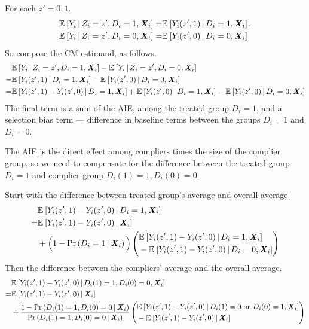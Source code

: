 For each $z' =0, 1$.
\begin{align*}
    \Egiven{Y_i}{Z_i = z', D_i = 1, \vec X_i}
    =& \Egiven{Y_i(z', 1)}{D_i = 1, \vec X_i}, \\
    \Egiven{Y_i}{Z_i = z', D_i = 0, \vec X_i}
    =& \Egiven{Y_i(z', 0)}{D_i = 0, \vec X_i}
\end{align*}
So compose the CM estimand, as follows.
\begin{align*}
    & \Egiven{Y_i}{Z_i = z', D_i = 1, \vec X_i}
    - \Egiven{Y_i}{Z_i = z', D_i = 0, \vec X_i} \\
    =& \Egiven{Y_i(z', 1)}{D_i = 1, \vec X_i}
        - \Egiven{Y_i(z', 0)}{D_i = 0, \vec X_i} \\
    =& \Egiven{Y_i(z', 1) - Y_i(z', 0)}{D_i = 1, \vec X_i}
    + \Egiven{Y_i(z', 0)}{D_i = 1, \vec X_i} - \Egiven{Y_i(z', 0)}{D_i = 0, \vec X_i}
\end{align*}
The final term is a sum of the AIE, among the treated group $D_i = 1$, and a selection bias term --- difference in baseline terms between the groups $D_i = 1$ and $D_i = 0$.

The AIE is the direct effect among compliers times the size of the complier group, so we need to compensate for the difference between the treated group $D_i = 1$ and complier group $D_i(1)= 1, D_i(0) = 0$.

Start with the difference between treated group's average and overall average.
\begin{align*}
    & \Egiven{Y_i(z', 1) - Y_i(z', 0)}{D_i = 1, \vec X_i} \\
    =& \Egiven{Y_i(z', 1) - Y_i(z', 0)}{\vec X_i} \\
    &+ \Big(1 - \Probgiven{D_i = 1}{\vec X_i} \Big)
    \left( \begin{aligned}
        &\Egiven{Y_i(z', 1) - Y_i(z', 0)}{D_i = 1, \vec X_i} \\ 
        &  - \Egiven{Y_i(z', 1) - Y_i(z', 0)}{D_i = 0, \vec X_i}
    \end{aligned} \right)
\end{align*}
Then the difference between the compliers' average and the overall average.
\begin{align*}
    & \Egiven{ Y_i(z', 1) - Y_i(z', 0)}{D_i(1) = 1, D_i(0) = 0, \vec X_i} \\
    =& \Egiven{Y_i(z', 1) - Y_i(z', 0)}{\vec X_i} \\
    & + \frac{1 - \Probgiven{D_i(1) = 1, D_i(0) = 0}{\vec X_i} }{
        \Probgiven{D_i(1) = 1, D_i(0) = 0}{\vec X_i}}
    \left( \begin{aligned}
        &\Egiven{Y_i(z', 1) - Y_i(z', 0)}{D_i(1) = 0 \text{ or } D_i(0)=1, \vec X_i} \\ 
        &  - \Egiven{Y_i(z', 1) - Y_i(z', 0)}{\vec X_i}
    \end{aligned} \right)
\end{align*}

